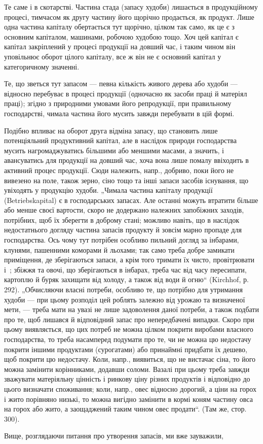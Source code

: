 
Те саме і в скотарстві. Частина стада (запасу худоби) лишається в продукційному процесі, тимчасом як
другу частину його щорічно продається, як продукт. Лише одна частина капіталу обертається тут
щорічно, цілком так само, як це є з основним капіталом, машинами, робочою худобою тощо. Хоч цей
капітал є капітал закріплений у процесі продукції на довший час, і таким чином він уповільнює оборот
цілого капіталу, все ж він не є основний капітал у категоричному значенні.

Те, що зветься тут запасом — певна кількість живого дерева або худоби — відносно перебуває в процесі
продукції (одночасно як засоби праці й матеріял праці); згідно з природними умовами його
репродукції, при правильному господарстві, чимала частина його мусить завжди перебувати в цій формі.

Подібно впливає на оборот друга відміна запасу, що становить лише потенціяльний продуктивний
капітал, але в наслідок природи господарства мусить нагромаджуватись більшими або меншими масами, а
значить, і авансуватись для продукції на довший час, хоча вона лише помалу ввіходить в активний
процес продукції. Сюди належить, напр., добриво, поки його не вивезено на поле, також зерно, сіно
тощо та інші запаси засобів існування, що увіходять у продукцію худоби. „Чимала частина капіталу
продукції (Betriebskapital) є в господарських запасах. Але останні можуть втратити більше або менше
своєї вартости, скоро не додержано належних запобіжних заходів, потрібних, щоб їх зберегти в доброму
стані; можливо навіть, що в наслідок недостатнього догляду частина запасів продукту й зовсім марно
пропаде для господарства. Ось чому тут потрібен особливо пильний догляд за інбарами, клунями,
пашенними коморами й льохами; так само треба добре замикати приміщення, де зберігаються запаси, а
крім того тримати їх чисто, провітрювати і~; збіжжя та овочі, що зберігаються в інбарах, треба
час від часу пересипати, картоплю й буряк захищати від холоду, а також від води й огню“ (Kirchhof,
р. 292). „Обчисляючи власні потреби, особливо те, що потрібно для утримання худоби — при цьому
розподіл цей роблять залежно від урожаю та визначеної мети, — треба мати на увазі не лише
задоволення даної потреби, а також подбати про те, щоб лишався й відповідний запас про непередбачені
випадки. Скоро при цьому виявляється, що цих потреб не можна цілком покрити виробами власного
господарства, то треба насамперед подумати про те, чи не можна цю недостачу покрити іншими
продуктами (сурогатами) або принаймні придбати їх дешево, щоб покрити цю недостачу. Коли, напр.,
виявиться, що не вистачає сіна, то його можна замінити корінниками, додавши соломи. Вазалі при цьому
треба завжди зважувати матеріяльну цінність і ринкову ціну різних продуктів і відповідно до цього
визначати споживання; коли, напр., овес відносно дорогий, а ціни на горох і жито порівняно низькі,
то можна вигідно замінити в кормі коням частину овса на горох або жито, а заощаджений таким чином
овес продати“. (Там же, стор. 300).

Вище, розглядаючи питання про утворення запасів, ми вже зауважили,
\parbreak{}  %
